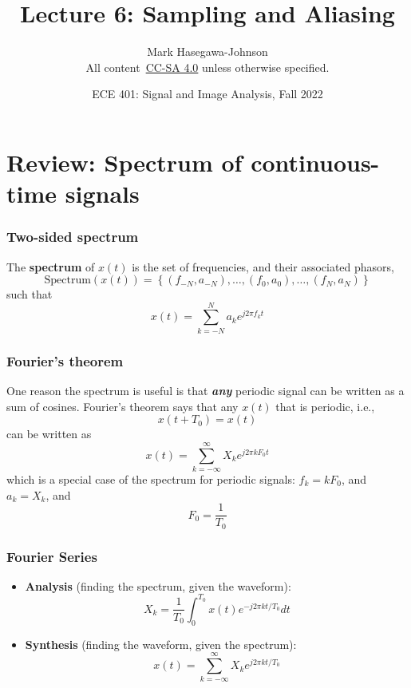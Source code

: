 \documentclass{beamer}
\title{Lecture 6: Sampling and Aliasing}
\author{Mark Hasegawa-Johnson\\All content~\href{https://creativecommons.org/licenses/by-sa/4.0/}{CC-SA 4.0} unless otherwise specified.}
\date{ECE 401: Signal and Image Analysis, Fall 2022}
\begin{document}
\begin{frame}
  \maketitle
\end{frame}

\begin{frame}
  \tableofcontents
\end{frame}

\section[Review]{Review: Spectrum of continuous-time signals}
\setcounter{subsection}{1}

\begin{frame}
  \frametitle{Two-sided spectrum}

  The {\bf spectrum} of $x(t)$ is the set of frequencies, and their
  associated phasors,
  \[
  \mbox{Spectrum}\left( x(t) \right) =
  \left\{ (f_{-N},a_{-N}), \ldots, (f_0,a_0), \ldots, (f_N,a_N) \right\}
  \]
  such that
  \[
  x(t) = \sum_{k=-N}^N a_ke^{j2\pi f_kt}
  \]
\end{frame}

\begin{frame}
  \frametitle{Fourier's theorem}

  One reason the spectrum is useful is that {\bf\em any} periodic
  signal can be written as a sum of cosines.  Fourier's theorem says that
  any $x(t)$ that is periodic, i.e.,
  \[
  x(t+T_0) = x(t)
  \]
  can be written as
  \[
  x(t) = \sum_{k=-\infty}^\infty X_k e^{j2\pi k F_0 t}
  \]
  which is a special case of the spectrum for periodic signals:
  $f_k=kF_0$, and $a_k=X_k$, and
  \[
  F_0 = \frac{1}{T_0}
  \]
\end{frame}

\begin{frame}
  \frametitle{Fourier Series}

  \begin{itemize}
  \item {\bf Analysis}  (finding the spectrum, given the waveform):
    \[
    X_k = \frac{1}{T_0}\int_0^{T_0} x(t)e^{-j2\pi kt/T_0}dt
    \]
  \item {\bf Synthesis} (finding the waveform, given the spectrum):
    \[
    x(t) = \sum_{k=-\infty}^\infty X_k e^{j2\pi kt/T_0}
    \]
  \end{itemize}
\end{frame}  
\end{document}
